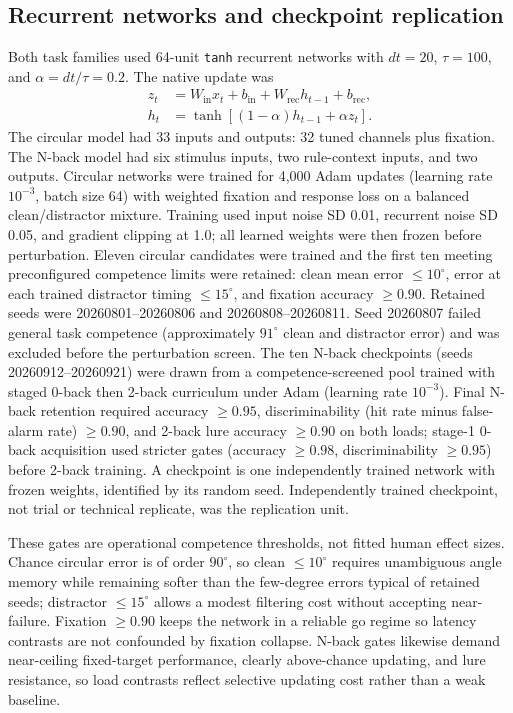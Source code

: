 \documentclass[11pt,reprint,aps,prl,floatfix,secnumarabic]{revtex4-2}
\begin{document}
\subsection{Recurrent networks and checkpoint replication}

Both task families used 64-unit \texttt{tanh} recurrent networks with
$dt=20$, $\tau=100$, and $\alpha=dt/\tau=0.2$. The native update was
\begin{align}
 z_t &= W_{\mathrm{in}}x_t+b_{\mathrm{in}}
      +W_{\mathrm{rec}}h_{t-1}+b_{\mathrm{rec}},\\
 h_t &= \tanh\!\left[(1-\alpha)h_{t-1}+\alpha z_t\right].
 \label{eq:native}
\end{align}
The circular model had 33 inputs and outputs: 32 tuned channels plus
fixation. The N-back model had six stimulus inputs, two rule-context inputs,
and two outputs. Circular networks were trained for 4,000 Adam updates
(learning rate $10^{-3}$, batch size 64) with weighted fixation and
response loss on a balanced clean/distractor mixture. Training used input noise
SD 0.01, recurrent noise SD 0.05, and gradient clipping at 1.0; all learned
weights were then frozen before perturbation. Eleven circular candidates were
trained and the first ten meeting preconfigured competence limits were retained:
clean mean error $\le10^\circ$, error at each trained distractor timing
$\le15^\circ$, and fixation accuracy $\ge0.90$. Retained seeds were
20260801--20260806 and 20260808--20260811. Seed 20260807 failed general task
competence (approximately $91^\circ$ clean and distractor error) and was
excluded before the perturbation screen. The ten N-back checkpoints
(seeds 20260912--20260921) were drawn from a competence-screened pool trained
with staged 0-back then 2-back curriculum under Adam (learning rate $10^{-3}$).
Final N-back retention required accuracy $\ge0.95$, discriminability
(hit rate minus false-alarm rate) $\ge0.90$, and 2-back lure accuracy
$\ge0.90$ on both loads; stage-1 0-back acquisition used stricter gates
(accuracy $\ge0.98$, discriminability $\ge0.95$) before 2-back training.
A checkpoint is one independently trained network with frozen weights,
identified by its random seed. Independently trained checkpoint, not trial or
technical replicate, was the replication unit.

These gates are operational competence thresholds, not fitted human effect
sizes. Chance circular error is of order $90^\circ$, so clean $\le10^\circ$
requires unambiguous angle memory while remaining softer than the few-degree
errors typical of retained seeds; distractor $\le15^\circ$ allows a modest
filtering cost without accepting near-failure. Fixation $\ge0.90$ keeps the
network in a reliable go regime so latency contrasts are not confounded by
fixation collapse. N-back gates likewise demand near-ceiling fixed-target
performance, clearly above-chance updating, and lure resistance, so load
contrasts reflect selective updating cost rather than a weak baseline.
\end{document}
